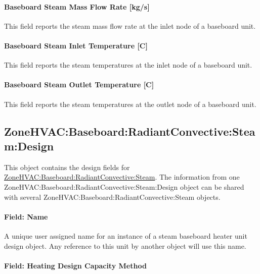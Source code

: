 \paragraph{Baseboard Steam Mass Flow Rate {[}kg/s{]}}\label{baseboard-steam-mass-flow-rate-kgs}

This field reports the steam mass flow rate at the inlet node of a baseboard unit.

\paragraph{Baseboard Steam Inlet Temperature {[}C{]}}\label{baseboard-steam-inlet-temperature-c}

This field reports the steam temperatures at the inlet node of a baseboard unit.

\paragraph{Baseboard Steam Outlet Temperature {[}C{]}}\label{baseboard-steam-outlet-temperature-c}

This field reports the steam temperatures at the outlet node of a baseboard unit.

\subsection{ZoneHVAC:Baseboard:RadiantConvective:Steam:Design}\label{zonehvac-baseboard-radiantconvective-steam-design}

This object contains the design fields for \hyperref[zonehvacbaseboardradiantconvectivesteam] {ZoneHVAC:Baseboard:RadiantConvective:Steam}. The information from one ZoneHVAC:Baseboard:RadiantConvective:Steam:Design object can be shared with several ZoneHVAC:Baseboard:RadiantConvective:Steam objects.

\paragraph{Field: Name}\label{steam-baseboard-design-name}

A unique user assigned name for an instance of a steam baseboard heater unit design object. Any reference to this unit by another object will use this name.

\paragraph{Field: Heating Design Capacity Method}\label{field-heating-design-capacity-method-1-000}

